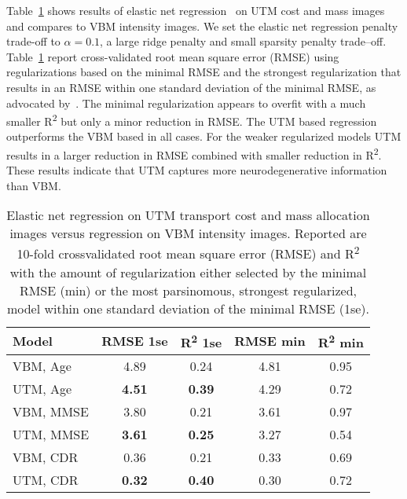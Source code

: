 \documentclass{llncs}
\begin{document}
Table~\ref{fig:prediction} shows results of elastic net
regression~\cite{Zou05regularizationand} on UTM cost and mass images and
compares to VBM intensity images. We set the elastic net regression penalty
trade-off to $\alpha=0.1$, a large ridge penalty and small sparsity penalty
trade--off.  Table~\ref{fig:prediction} report cross-validated root mean square
error (RMSE) using regularizations based on the minimal RMSE and the strongest
regularization that results in an RMSE within one standard deviation of the
minimal RMSE, as advocated by~\cite{Zou05regularizationand}.  The minimal
regularization appears to overfit with a much smaller R\textsuperscript{2}  but
only a minor reduction in RMSE. The UTM based regression outperforms the VBM
based in all cases. For the weaker regularized models UTM results in a larger
reduction in RMSE combined with smaller reduction in R\textsuperscript{2}.
These results indicate that UTM captures more neurodegenerative information
than VBM.
\begin{table}[h!]
\centering
\begin{tabular}{l|cc|cc}
  \parbox[b][4mm]{25mm }{Model  }  &
  \parbox[b][4mm]{17mm }{\centering RMSE 1se }  & 
  \parbox[b][4mm]{15mm }{\centering R\textsuperscript{2}  1se} & 
  \parbox[b][4mm]{17mm }{\centering RMSE min }  & 
  \parbox[b][4mm]{15mm }{\centering R\textsuperscript{2}  min} 
        \\ \hline \hline
  VBM, Age   & 4.89        & 0.24         & 4.81  & 0.95 \\
  UTM, Age   & {\bf 4.51}  & {\bf 0.39 }  & 4.29  & 0.72 \\ \hline
  VBM, MMSE  & 3.80        & 0.21         & 3.61  & 0.97 \\
  UTM, MMSE  & {\bf3.61 }  & {\bf 0.25}   & 3.27  & 0.54 \\ \hline
  VBM, CDR   & 0.36        & 0.21         & 0.33  & 0.69 \\
  UTM, CDR   & {\bf 0.32 } & {\bf 0.40 }  & 0.30  & 0.72 \\
\end{tabular} 
\caption{ \label{fig:prediction}  Elastic net regression on UTM transport cost
  and mass allocation images versus regression on VBM intensity images.
  Reported are 10-fold crossvalidated root mean square error (RMSE) and
  R\textsuperscript{2} with the amount of regularization either selected by the
  minimal RMSE (min) or the most parsinomous, strongest regularized, model
  within one standard deviation of the minimal RMSE (1se). 
  \vspace{-10mm}}
\end{table}
\end{document}
